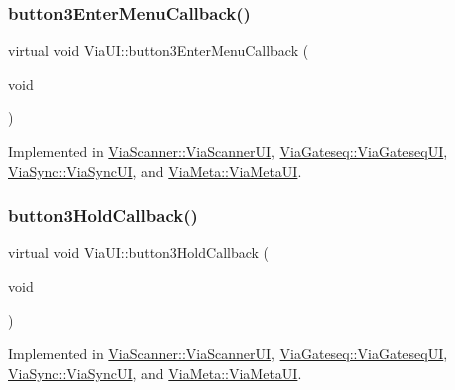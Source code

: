 \mbox{\label{class_via_u_i_a883081e46324dec82ad89f2e77cf4b65}} 
\subsubsection{\texorpdfstring{button3\+Enter\+Menu\+Callback()}{button3EnterMenuCallback()}}
{\footnotesize\ttfamily virtual void Via\+U\+I\+::button3\+Enter\+Menu\+Callback (\begin{DoxyParamCaption}\item[{void}]{ }\end{DoxyParamCaption})\hspace{0.3cm}{\ttfamily [pure virtual]}}



Implemented in \mbox{\hyperlink{class_via_scanner_1_1_via_scanner_u_i_a32f8e4caa95371961883c90a5803f314}{Via\+Scanner\+::\+Via\+Scanner\+UI}}, \mbox{\hyperlink{class_via_gateseq_1_1_via_gateseq_u_i_a634b6fe2c13f90490b6e8182b4854425}{Via\+Gateseq\+::\+Via\+Gateseq\+UI}}, \mbox{\hyperlink{class_via_sync_1_1_via_sync_u_i_a695a9d89eaf1b1e03bba057e4f89b3c2}{Via\+Sync\+::\+Via\+Sync\+UI}}, and \mbox{\hyperlink{class_via_meta_1_1_via_meta_u_i_abff70e527b92121c207699c8c8334ee6}{Via\+Meta\+::\+Via\+Meta\+UI}}.

\mbox{\label{class_via_u_i_a7334aea36cf78afac284dd5e899e8ace}} 
\subsubsection{\texorpdfstring{button3\+Hold\+Callback()}{button3HoldCallback()}}
{\footnotesize\ttfamily virtual void Via\+U\+I\+::button3\+Hold\+Callback (\begin{DoxyParamCaption}\item[{void}]{ }\end{DoxyParamCaption})\hspace{0.3cm}{\ttfamily [pure virtual]}}



Implemented in \mbox{\hyperlink{class_via_scanner_1_1_via_scanner_u_i_ac01a2eda088067d96b7691255d2841c6}{Via\+Scanner\+::\+Via\+Scanner\+UI}}, \mbox{\hyperlink{class_via_gateseq_1_1_via_gateseq_u_i_a662b7cd49c71accc227fb74611e8aab2}{Via\+Gateseq\+::\+Via\+Gateseq\+UI}}, \mbox{\hyperlink{class_via_sync_1_1_via_sync_u_i_af7088ee62cddc1187af86e970efe643a}{Via\+Sync\+::\+Via\+Sync\+UI}}, and \mbox{\hyperlink{class_via_meta_1_1_via_meta_u_i_a124e9edd67310235839dae92aa4bb9a9}{Via\+Meta\+::\+Via\+Meta\+UI}}.

